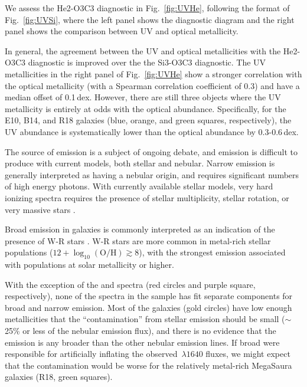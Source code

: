 \documentclass[trackchanges, preprint2]{aastex62}
\newcommand{\heii}{\ion{He}{2}}
\newcommand{\logten}{\ensuremath{\log_{10}}}
\newcommand{\logOH}{\ensuremath{\logten (\mathrm{O}/\mathrm{H})}\xspace}
\newcommand{\mage}{{\sc Meg}a{\sc S}a{\sc ura}\xspace}
\begin{document}
We assess the He2-O3C3 diagnostic in Fig.~\ref{fig:UVHe}, following the format of Fig.~\ref{fig:UVSi}, where the left panel shows the diagnostic diagram and the right panel shows the comparison between UV and optical metallicity.

In general, the agreement between the UV and optical metallicities with the He2-O3C3 diagnostic is improved over the the Si3-O3C3 diagnostic. The UV metallicities in the right panel of Fig.~\ref{fig:UVHe} show a stronger correlation with the optical metallicity (with a Spearman correlation coefficient of 0.3) and have a median offset of 0.1\,dex. However, there are still three objects where the UV metallicity is entirely at odds with the optical abundance. Specifically, for the E10, B14, and R18 galaxies (blue, orange, and green squares, respectively), the UV abundance is systematically lower than the optical abundance by 0.3-0.6\,dex.

The source of  emission is a subject of ongoing debate, and  emission is difficult to produce with current models, both stellar and nebular. Narrow  emission is generally interpreted as having a nebular origin, and requires significant numbers of high energy photons. With currently available stellar models, very hard ionizing spectra requires the presence of stellar multiplicity, stellar rotation, or very massive stars \citep[e.g.,][]{Stark+2014, Steidel+2016, Byler+2017, Choi+2017}. 

Broad  emission in galaxies is commonly interpreted as an indication of the presence of W-R stars \citep[e.g., ][]{Kunth+1985, Conti+1991, Schaerer+1999, Brinchmann+2008}. W-R stars are more common in metal-rich stellar populations ($12+\logOH \gtrsim 8$), with the strongest  emission associated with populations at solar metallicity or higher. 

With the exception of the \citet{Senchyna+2017} and \citet{Berg+2018} spectra (red circles and purple square, respectively), none of the spectra in the sample has fit separate components for broad and narrow  emission. Most of the \citet{Berg+2016} galaxies (gold circles) have low enough metallicities that the ``contamination'' from stellar emission should be small (${\sim}$25\% or less of the nebular emission flux), and there is no evidence that the  emission is any broader than the other nebular emission lines. If broad  were responsible for artificially inflating the observed \heii$\,\lambda1640$ fluxes, we might expect that the contamination would be worse for the relatively metal-rich \mage galaxies (R18, green squares).
\end{document}
